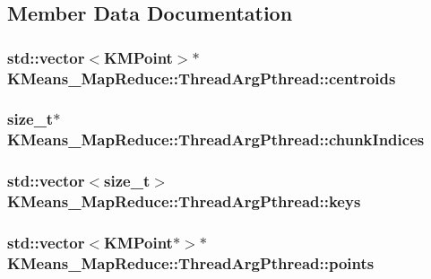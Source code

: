 \subsection{Member Data Documentation}
\hypertarget{classKMeans__MapReduce_1_1ThreadArgPthread_a1e5c64def4047acecb9bd1978654611a}{
\subsubsection[{centroids}]{\setlength{\rightskip}{0pt plus 5cm}std\-::vector$<${\bf K\-M\-Point}$>$$\ast$ K\-Means\-\_\-\-Map\-Reduce\-::\-Thread\-Arg\-Pthread\-::centroids}}\label{classKMeans__MapReduce_1_1ThreadArgPthread_a1e5c64def4047acecb9bd1978654611a}
\hypertarget{classKMeans__MapReduce_1_1ThreadArgPthread_aa440165b3414cf6a53a3308aecc932d0}{
\subsubsection[{chunk\-Indices}]{\setlength{\rightskip}{0pt plus 5cm}size\-\_\-t$\ast$ K\-Means\-\_\-\-Map\-Reduce\-::\-Thread\-Arg\-Pthread\-::chunk\-Indices}}\label{classKMeans__MapReduce_1_1ThreadArgPthread_aa440165b3414cf6a53a3308aecc932d0}
\hypertarget{classKMeans__MapReduce_1_1ThreadArgPthread_ad02c67b8e65d23efdd4a5f1cea26b658}{
\subsubsection[{keys}]{\setlength{\rightskip}{0pt plus 5cm}std\-::vector$<$size\-\_\-t$>$ K\-Means\-\_\-\-Map\-Reduce\-::\-Thread\-Arg\-Pthread\-::keys}}\label{classKMeans__MapReduce_1_1ThreadArgPthread_ad02c67b8e65d23efdd4a5f1cea26b658}
\hypertarget{classKMeans__MapReduce_1_1ThreadArgPthread_a5ecf183694a66b482fc7e8c421273682}{
\subsubsection[{points}]{\setlength{\rightskip}{0pt plus 5cm}std\-::vector$<${\bf K\-M\-Point}$\ast$$>$$\ast$ K\-Means\-\_\-\-Map\-Reduce\-::\-Thread\-Arg\-Pthread\-::points}}\label{classKMeans__MapReduce_1_1ThreadArgPthread_a5ecf183694a66b482fc7e8c421273682}
